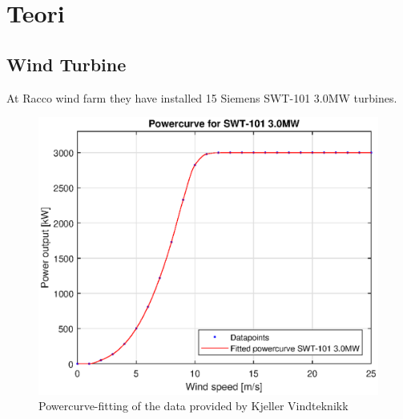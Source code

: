 \documentclass[a4paper]{report}
\begin{document}

\chapter{Teori}

\section{Wind Turbine}
At Racco wind farm they have installed 15 Siemens SWT-101 3.0MW turbines.
\begin{figure}
    \centering
    \includegraphics{Theory/figures/PowerCurve}
    \caption{Powercurve-fitting of the data provided by Kjeller Vindteknikk}
    \label{fig:my_label}
\end{figure}
\end{document}

